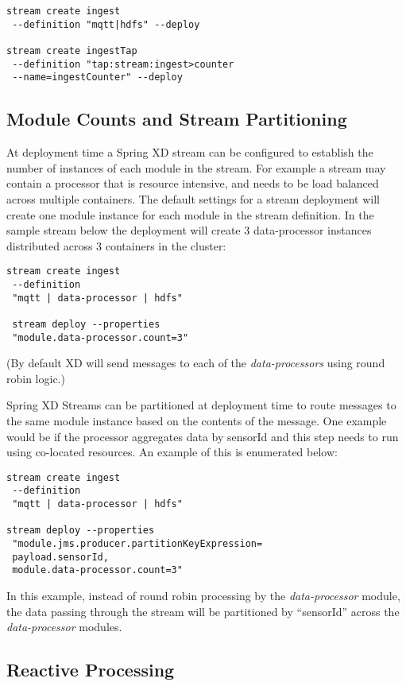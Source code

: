 \begin{lstlisting}
stream create ingest
 --definition "mqtt|hdfs" --deploy

stream create ingestTap
 --definition "tap:stream:ingest>counter
 --name=ingestCounter" --deploy
\end{lstlisting}

\subsection {Module Counts and Stream Partitioning}
At deployment time a Spring XD stream can be configured to establish the number
of instances of each module in the stream. For example a stream may contain
a processor that is resource intensive, and needs to be
load balanced across multiple containers. The default
settings for a stream deployment will create one module instance for each
module in the stream definition. In the sample stream below the
deployment will create 3 data-processor instances distributed
across 3 containers in the cluster:

\begin{lstlisting}
stream create ingest
 --definition
 "mqtt | data-processor | hdfs"

 stream deploy --properties
 "module.data-processor.count=3"
\end{lstlisting}

(By default XD will send messages to each of the \emph{data-processors}
using round robin logic.)

Spring XD Streams can be partitioned at deployment time to route messages to the
same module instance based on the contents of the message. One example
would be if the processor aggregates data by sensorId and this step needs to
run using co-located resources.  An example of this is enumerated below:

\begin{lstlisting}
stream create ingest
 --definition
 "mqtt | data-processor | hdfs"

stream deploy --properties
 "module.jms.producer.partitionKeyExpression=
 payload.sensorId,
 module.data-processor.count=3"
\end{lstlisting}

In this example, instead of round robin processing by the \emph{data-processor}
module, the data passing through the stream will be partitioned by ``sensorId''
across the \emph{data-processor} modules.

\subsection {Reactive Processing}


